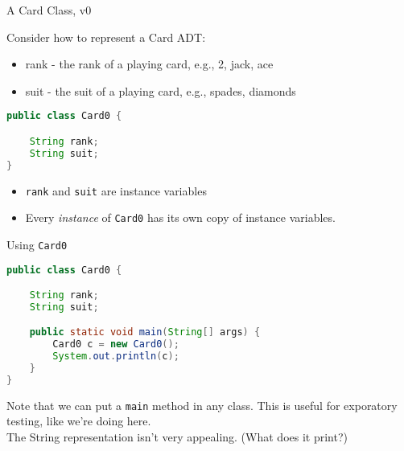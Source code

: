 \documentclass{beamer}
\begin{document}
\begin{frame}[fragile]{A Card Class, v0}



Consider how to represent a Card ADT:
\begin{itemize}
\item rank - the rank of a playing card, e.g., 2, jack, ace
\item suit - the suit of a playing card, e.g., spades, diamonds
\end{itemize}

\begin{lstlisting}[language=Java]
public class Card0 {

    String rank;
    String suit;
}
\end{lstlisting}

\begin{itemize}
\item {\tt rank} and {\tt suit} are instance variables
\item Every {\it instance} of {\tt Card0} has its own copy of instance variables.
\end{itemize}

\end{frame}

\begin{frame}[fragile]{Using {\tt Card0}}



\begin{lstlisting}[language=Java]
public class Card0 {

    String rank;
    String suit;

    public static void main(String[] args) {
        Card0 c = new Card0();
        System.out.println(c);
    }
}
\end{lstlisting}

Note that we can put a {\tt main} method in any class. This is useful for exporatory testing, like we're doing here.\\
\vspace{.1in}
The String representation isn't very appealing.  (What does it print?)

\end{frame}
\end{document}
